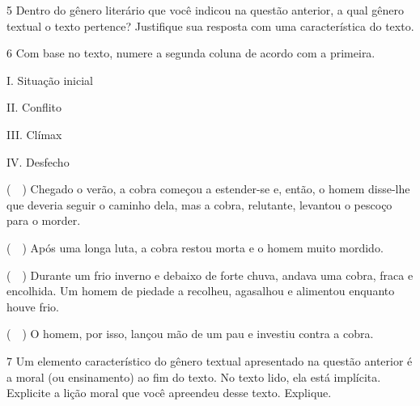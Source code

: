 
\num{5} Dentro do gênero literário que você indicou na questão anterior,
a qual gênero textual o texto pertence? Justifique sua resposta com uma característica do texto.


\num{6} Com base no texto, numere a segunda coluna de acordo com a
primeira.

\begin{multicols}{2}

I. Situação inicial

II. Conflito

III. Clímax

IV. Desfecho
\columnbreak

(~~) Chegado o verão, a cobra começou a
estender-se e, então, o homem disse-lhe que deveria seguir o caminho
dela, mas a cobra, relutante, levantou o pescoço para o morder.

(~~) Após uma longa luta, a cobra restou morta e o homem muito mordido.

(~~) Durante um frio
inverno e debaixo de forte chuva, andava uma cobra, fraca e encolhida.
Um homem de piedade a recolheu, agasalhou e alimentou enquanto houve frio. 

(~~) O homem, por isso, lançou mão de um
pau e investiu contra a cobra.
\end{multicols}

\num{7} Um elemento característico do gênero textual apresentado na
questão anterior é a moral (ou ensinamento) ao fim do texto. No texto
lido, ela está implícita. Explicite a lição moral que você apreendeu desse texto. Explique.


